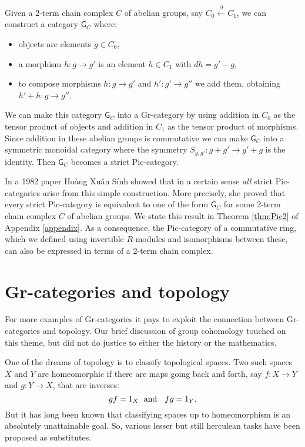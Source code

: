 \documentclass[reqno]{amsart}
\newcommand{\maps}{\colon}    %
\newcommand{\G}{{\mathsf{G}}}   %
\theoremstyle{definition}
\begin{document}
Given a 2-term chain complex $C$ of abelian groups, say $C_0 \xleftarrow{\;\partial\;} C_1 $, we can construct a category $\G_C$ where:
\begin{itemize}
\item  objects are elements $g \in C_0$,
\item  a morphism $h \maps g \to g'$ is an element $h \in C_1$ with $dh = g' - g$,
\item to compose morphisms $h \maps g \to g'$ and $h' \maps g' \to g''$ we add them,
obtaining $h' + h \maps g \to g''$.
\end{itemize}
We can make this category $\G_C$ into a Gr-category by using addition in $C_0$ as the tensor product of objects and addition in $C_1$ as the tensor product of morphisms.  Since addition in these abelian groups is commutative we can make $\G_C$ into a symmetric monoidal category where the symmetry $S_{g,g'} \colon g + g' \to g' + g$ is the identity.  Then $\G_C$ becomes a strict Pic-category.

In a 1982 paper \cite{H82} Ho\`ang Xu\^an S\'inh showed that in a certain sense \emph{all} strict Pic-categories arise from this simple construction.  More precisely, she proved that every strict Pic-category is equivalent to one of the form $\G_C$ for some 2-term chain complex $C$ of abelian groups.   We state this result in Theorem \ref{thm:Pic2} of Appendix \ref{appendix}.  As a consequence, the Pic-category of a commutative ring, which we defined using invertible $R$-modules and isomorphisms between these, can also be expressed in terms of a 2-term chain complex.

\section{Gr-categories and topology}
\label{sec:topology}

For more examples of Gr-categories it pays to exploit the connection between Gr-categories and topology.  Our brief discussion of group cohomology touched on this theme, but did not do justice to either the history or the mathematics.  

One of the dreams of topology is to classify topological spaces.   Two such spaces $X$ and $Y$ are homeomorphic if there are maps going back and forth, say $f \maps X \to Y$ and $g \maps Y \to X$, that are inverses:
\[        gf = 1_X \textrm{\; and \; }  fg = 1_Y. \]    
But it has long been known that classifying spaces up to homeomorphism is an absolutely unattainable goal.  So, various lesser but still herculean tasks have been proposed as substitutes.  
\end{document}
